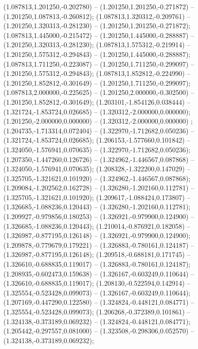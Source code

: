  (1.087813,1.201250,-0.202780) -- (1.201250,1.201250,-0.271872) -- (1.201250,1.087813,-0.260812);
 (1.087813,1.320312,-0.209761) -- (1.201250,1.320313,-0.281230) -- (1.201250,1.201250,-0.271872);
 (1.087813,1.445000,-0.215472) -- (1.201250,1.445000,-0.288887) -- (1.201250,1.320313,-0.281230);
 (1.087813,1.575312,-0.219914) -- (1.201250,1.575312,-0.294843) -- (1.201250,1.445000,-0.288887);
 (1.087813,1.711250,-0.223087) -- (1.201250,1.711250,-0.299097) -- (1.201250,1.575312,-0.294843);
 (1.087813,1.852812,-0.224990) -- (1.201250,1.852812,-0.301649) -- (1.201250,1.711250,-0.299097);
 (1.087813,2.000000,-0.225625) -- (1.201250,2.000000,-0.302500) -- (1.201250,1.852812,-0.301649);
 (1.203101,-1.854126,0.038444) -- (1.321724,-1.853724,0.026685) -- (1.320312,-2.000000,0.000000);
 (1.201250,-2.000000,0.000000) -- (1.320312,-2.000000,0.000000) ;
 (1.204735,-1.713314,0.072404) -- (1.322970,-1.712682,0.050236) -- (1.321724,-1.853724,0.026685);
 (1.206153,-1.577660,0.101842) -- (1.324050,-1.576941,0.070635) -- (1.322970,-1.712682,0.050236);
 (1.207350,-1.447260,0.126726) -- (1.324962,-1.446567,0.087868) -- (1.324050,-1.576941,0.070635);
 (1.208328,-1.322200,0.147029) -- (1.325705,-1.321621,0.101920) -- (1.324962,-1.446567,0.087868);
 (1.209084,-1.202562,0.162728) -- (1.326280,-1.202160,0.112781) -- (1.325705,-1.321621,0.101920);
 (1.209617,-1.088424,0.173807) -- (1.326685,-1.088236,0.120443) -- (1.326280,-1.202160,0.112781);
 (1.209927,-0.979856,0.180253) -- (1.326921,-0.979900,0.124900) -- (1.326685,-1.088236,0.120443);
 (1.210014,-0.876921,0.182058) -- (1.326987,-0.877195,0.126148) -- (1.326921,-0.979900,0.124900);
 (1.209878,-0.779679,0.179221) -- (1.326883,-0.780161,0.124187) -- (1.326987,-0.877195,0.126148);
 (1.209518,-0.688181,0.171745) -- (1.326610,-0.688835,0.119017) -- (1.326883,-0.780161,0.124187);
 (1.208935,-0.602473,0.159638) -- (1.326167,-0.603249,0.110644) -- (1.326610,-0.688835,0.119017);
 (1.208130,-0.522594,0.142914) -- (1.325554,-0.523428,0.099073) -- (1.326167,-0.603249,0.110644);
 (1.207169,-0.447290,0.122580) -- (1.324824,-0.448121,0.084771) -- (1.325554,-0.523428,0.099073);
 (1.206268,-0.372389,0.101861) -- (1.324138,-0.373189,0.069232) -- (1.324824,-0.448121,0.084771);
 (1.205442,-0.297557,0.081000) -- (1.323508,-0.298306,0.052570) -- (1.324138,-0.373189,0.069232);
